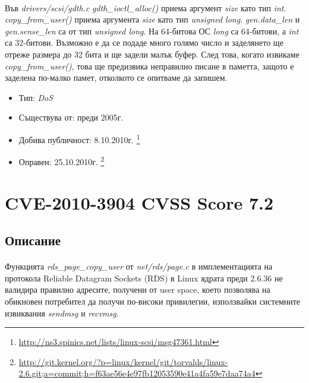 \documentclass[a4paper,12pt,leqno]{article}
\begin{document}
\paragraph{}
Във \textit{drivers/scsi/gdth.c}
\textit{gdth\_ioctl\_alloc()} приема аргумент \textit{size} като тип \textit{int}.
\textit{copy\_from\_user()} приема аргумента \textit{size} като тип \textit{unsigned long}.
\textit{gen.data\_len} и \textit{gen.sense\_len} са от тип \textit{unsigned long}.
На 64-битова ОС \textit{long} са 64-битови, а \textit{int} са 32-битови.
Възможно е да се подаде много голямо число и заделянето ще отреже размера до 32 бита
и ще задели малък буфер. След това, когато извикаме \textit{copy\_from\_user()},
това ще предизвика неправилно писане в паметта, защото е заделена по-малко памет,
отколкото се опитваме да запишем.
\begin{itemize}
    \item Тип: \textit{DoS}
    \item Съществува от: преди 2005г.
  	\item Добива публичност: 8.10.2010г. \footnote{\url{http://ns3.spinics.net/lists/linux-scsi/msg47361.html}}
    \item Оправен: 25.10.2010г. \footnote{\url{http://git.kernel.org/?p=linux/kernel/git/torvalds/linux-2.6.git;a=commit;h=f63ae56e4e97fb12053590e41a4fa59e7daa74a4}}
\end{itemize}





\section{CVE-2010-3904 CVSS Score 7.2}
\subsection{Описание}
\paragraph{}
Функцията \textit{rds\_page\_copy\_user} от  \textit{net/rds/page.c} в имплементацията на протокола Reliable Datagram Sockets (RDS) в Linux ядрата преди 2.6.36 не валидира правилно адресите, получени от user space, което позволява на обикновен потребител да получи по-високи привилегии, използвайки системните извиквания \textit{sendmsg} и \textit{recvmsg}.\\
\end{document}
